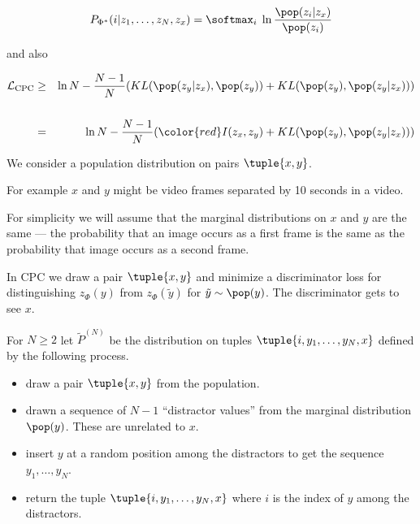 {$$P_{\Phi^*}(i|z_1,\ldots,z_N,z_x) = \softmax_i \;\ln \frac{\pop(z_i|z_x)}{\pop(z_i)}$$

and also

{\huge
\begin{eqnarray*}
{\cal L}_\mathrm{CPC} & \geq & \ln N - \frac{N-1}{N}(KL(\pop(z_y|z_x),\pop(z_y)) + KL(\pop(z_y),\pop(z_y|z_x))) \\
\\
& = & \ln N - \frac{N-1}{N}({\color{red} I(z_x,z_y)} + KL(\pop(z_y),\pop(z_y|z_x)))
\end{eqnarray*}
}
   

We consider a population distribution on pairs $\tuple{x,y}$.

\vfill
For example $x$ and $y$ might be video frames separated by 10 seconds in a video.

\vfill
For simplicity we will assume that the marginal distributions on $x$ and $y$ are the same --- the probability that an image occurs as a first frame
is the same as the probability that image occurs as a second frame.

\vfill
In CPC we draw a pair $\tuple{x,y}$ and {\color{red} minimize} a discriminator loss for distinguishing $z_\Phi(y)$ from $z_\Phi(\tilde{y})$ for $\tilde{y} \sim \pop(y)$.
The discriminator gets to see $x$.


For $N \geq 2$ let  $\tilde{P}^{(N)}$ be the distribution on tuples $\tuple{i,y_1,\ldots,y_N,x}$
defined by the following process.

\begin{itemize}
\item draw a pair $\tuple{x,y}$ from the population.

\item drawn a sequence of $N-1$ ``distractor values'' from the marginal distribution $\pop(y)$.  These are unrelated to $x$.

\item insert $y$ at a random position among the distractors to get the sequence
$y_1,\ldots,y_N$.

\item return the tuple $\tuple{i,y_1,\ldots,y_N,x}$ where $i$ is the index of $y$ among the distractors.
\end{itemize}


}
